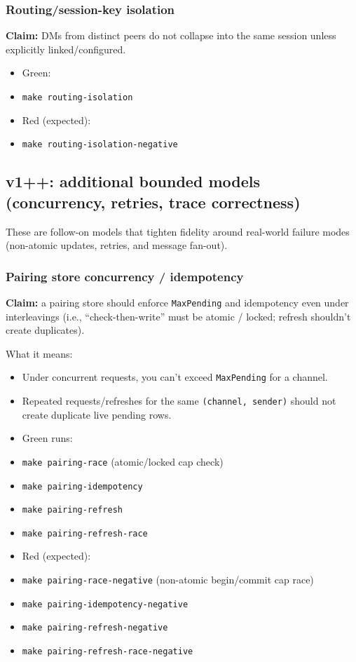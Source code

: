 \subsubsection{Routing/session-key isolation}


\textbf{Claim:} DMs from distinct peers do not collapse into the same session unless explicitly linked/configured.

\begin{itemize}
  \item Green:
  \item \texttt{make routing-isolation}
  \item Red (expected):
  \item \texttt{make routing-isolation-negative}
\end{itemize}


\subsection{v1++: additional bounded models (concurrency, retries, trace correctness)}


These are follow-on models that tighten fidelity around real-world failure modes (non-atomic updates, retries, and message fan-out).

\subsubsection{Pairing store concurrency / idempotency}


\textbf{Claim:} a pairing store should enforce \texttt{MaxPending} and idempotency even under interleavings (i.e., “check-then-write” must be atomic / locked; refresh shouldn’t create duplicates).

What it means:

\begin{itemize}
  \item Under concurrent requests, you can’t exceed \texttt{MaxPending} for a channel.
  \item Repeated requests/refreshes for the same \texttt{(channel, sender)} should not create duplicate live pending rows.
\end{itemize}


\begin{itemize}
  \item Green runs:
  \item \texttt{make pairing-race} (atomic/locked cap check)
  \item \texttt{make pairing-idempotency}
  \item \texttt{make pairing-refresh}
  \item \texttt{make pairing-refresh-race}
  \item Red (expected):
  \item \texttt{make pairing-race-negative} (non-atomic begin/commit cap race)
  \item \texttt{make pairing-idempotency-negative}
  \item \texttt{make pairing-refresh-negative}
  \item \texttt{make pairing-refresh-race-negative}
\end{itemize}


